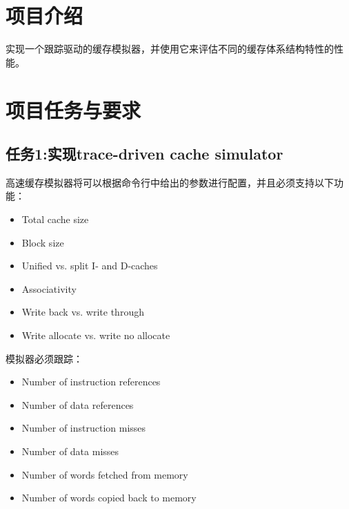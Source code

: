 \documentclass[12pt,hyperref,a4paper,UTF8]{ctexart}
\begin{document}
\cover

%
%

\thispagestyle{empty} %

\newpage
\tableofcontents

\newpage


\section{项目介绍}
实现一个跟踪驱动的缓存模拟器，并使用它来评估不同的缓存体系结构特性的性能。

\section{项目任务与要求}

\subsection*{任务1:实现trace-driven cache simulator}

高速缓存模拟器将可以根据命令行中给出的参数进行配置，并且必须支持以下功能：

\begin{itemize}
    \item Total cache size
    \item Block size
    \item Unified vs. split I- and D-caches
    \item Associativity
    \item Write back vs. write through
    \item Write allocate vs. write no allocate
  
\end{itemize}

模拟器必须跟踪：


\begin{itemize}
     \item  Number of instruction references
     \item  Number of data references
     \item  Number of instruction misses
     \item  Number of data misses
     \item  Number of words fetched from memory
     \item  Number of words copied back to memory
\end{itemize}
\end{document}
